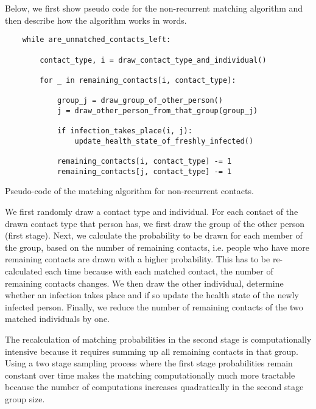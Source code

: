 Below, we first show pseudo code for the non-recurrent matching algorithm and then
describe how the algorithm works in words.

\begin{listing}
    \label{code:matching}
    \begin{verbatim}
    while are_unmatched_contacts_left:

        contact_type, i = draw_contact_type_and_individual()

        for _ in remaining_contacts[i, contact_type]:

            group_j = draw_group_of_other_person()
            j = draw_other_person_from_that_group(group_j)

            if infection_takes_place(i, j):
                update_health_state_of_freshly_infected()

            remaining_contacts[i, contact_type] -= 1
            remaining_contacts[j, contact_type] -= 1
    \end{verbatim}
    \caption{Pseudo-code of the matching algorithm for non-recurrent contacts.}
\end{listing}

We first randomly draw a contact type and individual. For each contact of the drawn
contact type that person has, we first draw the group of the other person (first stage).
Next, we calculate the probability to be drawn for each member of the group, based on
the number of remaining contacts, i.e. people who have more remaining contacts are drawn
with a higher probability. This has to be re-calculated each time because with each
matched contact, the number of remaining contacts changes. We then draw the other
individual, determine whether an infection takes place and if so update the health state
of the newly infected person. Finally, we reduce the number of remaining contacts of the
two matched individuals by one.

The recalculation of matching probabilities in the second stage is computationally
intensive because it requires summing up all remaining contacts in that group. Using a
two stage sampling process where the first stage probabilities remain constant over time
makes the matching computationally much more tractable because the number of
computations increases quadratically in the second stage group size.
